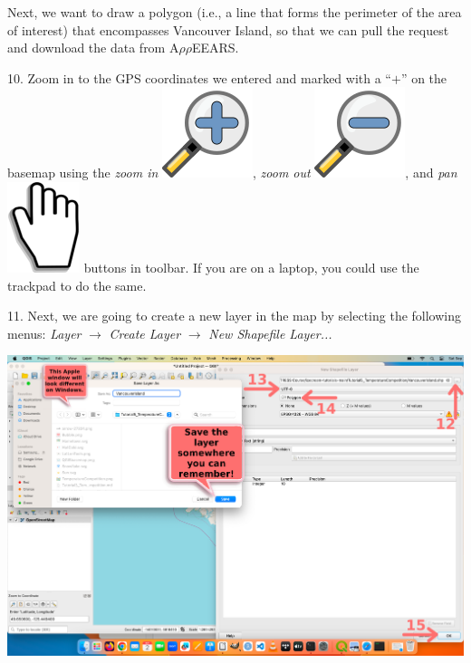 \documentclass[oneside,a4paper,11pt,explicit]{book}
\begin{document}
	Next, we want to draw a polygon (i.e., a line that forms the perimeter of the area of interest) that encompasses Vancouver Island, so that we can pull the request and download the data from A$\rho\rho$EEARS.
	
	10. Zoom in to the GPS coordinates we entered and marked with a ``$+$'' on the basemap using the \textit{zoom in} \includegraphics[height=\fontcharht\font`\B]{mActionZoomIn.png}, \textit{zoom out} \includegraphics[height=\fontcharht\font`\B]{mActionZoomOut.png}, and \textit{pan} \includegraphics[height=\fontcharht\font`\B]{mActionPan.png} buttons in toolbar. If you are on a laptop, you could use the trackpad to do the same.
	
	11. Next, we are going to create a new layer in the map by selecting the following menus: \textit{Layer} $\rightarrow$ \textit{Create Layer} $\rightarrow$ \textit{New Shapefile Layer...}
	
	\centerline{\includegraphics[width=.9\textwidth]{SaveLayer.png}}
	
\end{document}
